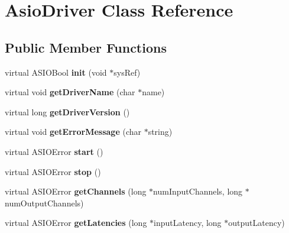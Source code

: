 \hypertarget{class_asio_driver}{}\section{Asio\+Driver Class Reference}
\label{class_asio_driver}
\subsection*{Public Member Functions}
\begin{DoxyCompactItemize}
\item 
virtual A\+S\+I\+O\+Bool {\bfseries init} (void $\ast$sys\+Ref)\hypertarget{class_asio_driver_a7bfd0472371cf44a417ff0a32b93612d}{}\label{class_asio_driver_a7bfd0472371cf44a417ff0a32b93612d}

\item 
virtual void {\bfseries get\+Driver\+Name} (char $\ast$name)\hypertarget{class_asio_driver_a80875c5742cccd393144434a7ae45cb9}{}\label{class_asio_driver_a80875c5742cccd393144434a7ae45cb9}

\item 
virtual long {\bfseries get\+Driver\+Version} ()\hypertarget{class_asio_driver_aac6f9f58ba334e9b3478c940d353fdde}{}\label{class_asio_driver_aac6f9f58ba334e9b3478c940d353fdde}

\item 
virtual void {\bfseries get\+Error\+Message} (char $\ast$string)\hypertarget{class_asio_driver_aa424b378164609c4522f6c55b4ba0f0c}{}\label{class_asio_driver_aa424b378164609c4522f6c55b4ba0f0c}

\item 
virtual A\+S\+I\+O\+Error {\bfseries start} ()\hypertarget{class_asio_driver_a7ae4a5fb0f050d6a06c99739a73c3805}{}\label{class_asio_driver_a7ae4a5fb0f050d6a06c99739a73c3805}

\item 
virtual A\+S\+I\+O\+Error {\bfseries stop} ()\hypertarget{class_asio_driver_a6268134fd60c6e867c98fba20d49724e}{}\label{class_asio_driver_a6268134fd60c6e867c98fba20d49724e}

\item 
virtual A\+S\+I\+O\+Error {\bfseries get\+Channels} (long $\ast$num\+Input\+Channels, long $\ast$num\+Output\+Channels)\hypertarget{class_asio_driver_a8e93196b70976f9b17460c7626ea17be}{}\label{class_asio_driver_a8e93196b70976f9b17460c7626ea17be}

\item 
virtual A\+S\+I\+O\+Error {\bfseries get\+Latencies} (long $\ast$input\+Latency, long $\ast$output\+Latency)\hypertarget{class_asio_driver_a1943b392aaa1a63192737d9e6d424817}{}\label{class_asio_driver_a1943b392aaa1a63192737d9e6d424817}


\end{DoxyCompactItemize}
